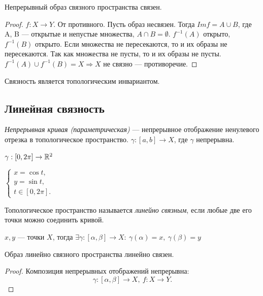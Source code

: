\begin{statement}
    Непрерывный образ связного пространства связен.
\end{statement}
\begin{proof}
    $f: X \to Y$. От противного. Пусть образ несвязен. Тогда $Im f = A \cup B$, где A, B — открытые и непустые множества, $A \cap B = \emptyset$. $f^{-1}(A)$ открыто, $f^{-1}(B)$ открыто. Если множества не пересекаются, то и их образы не пересекаются. Так как множества не пусты, то и их образы не пусты. $f^{-1}(A) \cup f^{-1}(B) = X \Rightarrow X$ не связно — противоречие. 
\end{proof}

\begin{remark}
    Связность является топологическим инвариантом.
\end{remark}


\subsection{Линейная связность}
\begin{definition}
    \textit{Непрерывная кривая (параметрическая)} — непрерывное отображение ненулевого отрезка в топологическое пространство. $\gamma: [a,b] \to X$, где $\gamma$ непрерывна.
\end{definition}

\begin{example}
   $\gamma: [0, 2 \pi] \to \mathbb{R}^{2}$

    $\begin{cases}
        x = \cos{t}, \\
        y = \sin{t}, \\
        t \in [0, 2 \pi].
    \end{cases}$ 
\end{example}


\begin{definition}
    Топологическое пространство называется \textit{линейно связным}, если любые две его точки можно соединить кривой.
\end{definition}

$x, y$ — точки $X$, тогда $\exists \gamma: [\alpha, \beta] \to X: \ \gamma(\alpha) = x, \ \gamma(\beta) = y$

\begin{statement}
    Образ линейно связного пространства линейно связен.
\end{statement}
\begin{proof}
    Композиция непрерывных отображений непрерывна:
    $$\gamma: [\alpha, \beta] \to X, \ f: X \to Y.$$
\end{proof}

